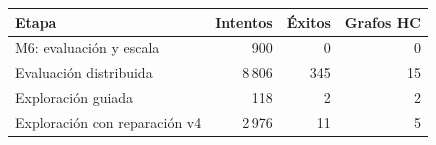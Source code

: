 \begin{tabularx}{\linewidth}{Yrrr}
\toprule
Etapa & Intentos & Éxitos & Grafos HC \\ \midrule
M6: evaluación y escala & 900 & 0 & 0 \\
Evaluación distribuida & 8\,806 & 345 & 15 \\
Exploración guiada & 118 & 2 & 2 \\
Exploración con reparación v4 & 2\,976 & 11 & 5 \\
\bottomrule\end{tabularx}
